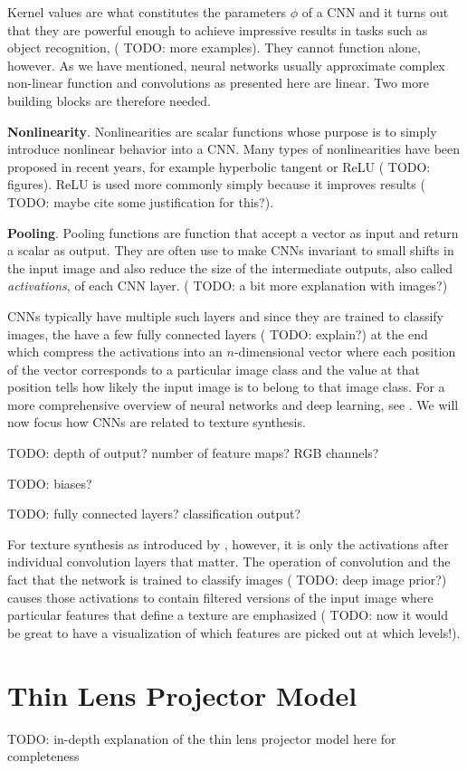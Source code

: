 Kernel values are what constitutes the parameters \(\phi\) of a CNN and it turns out that they are powerful enough to achieve impressive results in tasks such as object recognition, ({\color{red} TODO: more examples}). They cannot function alone, however. As we have mentioned, neural networks usually approximate complex non-linear function and convolutions as presented here are linear. Two more building blocks are therefore needed.

\textbf{Nonlinearity}. Nonlinearities are scalar functions whose purpose is to simply introduce nonlinear behavior into a CNN. Many types of nonlinearities have been proposed in recent years, for example hyperbolic tangent or ReLU ({\color{red} TODO: figures}). ReLU is used more commonly simply because it improves results ({\color{red} TODO: maybe cite some justification for this?}).

\textbf{Pooling}. Pooling functions are function that accept a vector as input and return a scalar as output. They are often use to make CNNs invariant to small shifts in the input image and also reduce the size of the intermediate outputs, also called \textit{activations}, of each CNN layer. ({\color{red} TODO: a bit more explanation with images?})

CNNs typically have multiple such layers and since they are trained to classify images, the have a few fully connected layers ({\color{red} TODO:  explain?}) at the end which compress the activations into an \(n\)-dimensional vector where each position of the vector corresponds to a particular image class and the value at that position tells how likely the input image is to belong to that image class. For a more comprehensive overview of neural networks and deep learning, see \citet{Goodfellow2016}. We will now focus how CNNs are related to texture synthesis.

{\color{red} TODO: depth of output? number of feature maps? RGB channels?}

{\color{red} TODO: biases?}

{\color{red} TODO: fully connected layers? classification output?}

For texture synthesis as introduced by \citet{Gatys2015}, however, it is only the activations after individual convolution layers that matter. The operation of convolution and the fact that the network is trained to classify images ({\color{red} TODO: deep image prior?}) causes those activations to contain filtered versions of the input image where particular features that define a texture are emphasized ({\color{red} TODO: now it would be great to have a visualization of which features are picked out at which levels!}).

\chapter{Thin Lens Projector Model}
\label{chapter:appendix-projector}

{\color{red} TODO: in-depth explanation of the thin lens projector model here for completeness}
